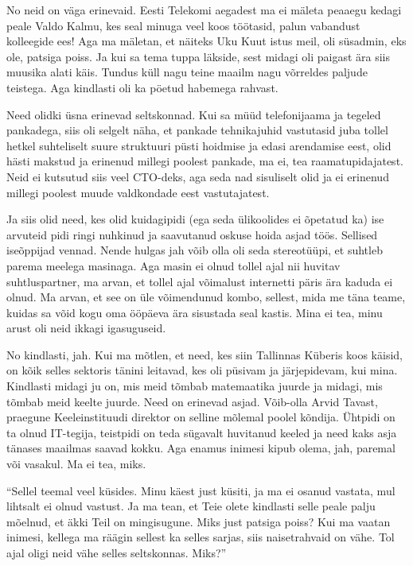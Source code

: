No neid on väga erinevaid. Eesti Telekomi aegadest ma ei mäleta peaaegu kedagi 
peale Valdo Kalmu, kes seal minuga veel koos töötasid, 
palun vabandust kolleegide ees! Aga ma mäletan, et näiteks Uku 
Kuut istus meil, oli süsadmin, eks ole, patsiga poiss. Ja 
kui sa tema tuppa läkside, sest midagi oli paigast ära siis muusika alati käis. 
Tundus küll nagu teine maailm nagu võrreldes paljude teistega. Aga kindlasti 
oli ka pöetud habemega rahvast.  

Need olidki üsna erinevad seltskonnad. Kui sa müüd telefonijaama ja  tegeled 
pankadega, siis oli selgelt näha, et pankade tehnikajuhid vastutasid juba 
tollel hetkel suhteliselt suure struktuuri püsti hoidmise ja edasi arendamise 
eest, olid hästi makstud ja erinenud millegi poolest pankade, ma ei, tea 
raamatupidajatest. Neid ei kutsutud siis veel CTO-deks, aga seda nad sisuliselt 
olid ja ei erinenud millegi poolest muude valdkondade eest vastutajatest. 

Ja siis olid need, kes olid kuidagipidi (ega seda ülikoolides ei õpetatud ka) 
ise arvuteid pidi ringi nuhkinud ja saavutanud oskuse hoida asjad töös. 
Sellised iseõppijad vennad. Nende hulgas jah võib olla oli seda stereotüüpi, et 
suhtleb parema meelega masinaga. Aga masin ei olnud tollel ajal nii huvitav 
suhtluspartner, ma arvan, et tollel ajal võimalust internetti päris ära kaduda 
ei olnud. Ma arvan, et see on üle võimendunud kombo, sellest, mida me täna 
teame, kuidas sa võid kogu oma ööpäeva ära sisustada seal kastis. Mina ei tea, 
minu arust oli neid ikkagi igasuguseid.


No kindlasti, jah. Kui ma mõtlen, et need, kes siin Tallinnas 
Küberis koos käisid, on kõik selles sektoris tänini  leitavad, kes 
oli püsivam ja järjepidevam, kui mina. Kindlasti midagi ju on, mis meid tõmbab 
matemaatika juurde ja midagi, mis tõmbab meid keelte juurde. Need on erinevad 
asjad. Võib-olla Arvid Tavast, praegune 
Keeleinstituudi direktor on selline mõlemal poolel 
kõndija. Ühtpidi on ta olnud IT-tegija, teistpidi on teda sügavalt huvitanud 
keeled ja need kaks asja tänases maailmas saavad  kokku. Aga enamus inimesi 
kipub olema, jah, paremal või vasakul. Ma ei tea, miks.

\enquote{Sellel teemal veel küsides. Minu käest just küsiti, ja ma ei osanud 
vastata, mul lihtsalt ei olnud vastust. Ja ma tean, et Teie olete kindlasti 
selle peale palju mõelnud, et äkki Teil on mingisugune. Miks just patsiga 
poiss? Kui ma vaatan  inimesi, kellega ma räägin sellest ka selles sarjas, siis 
naisetrahvaid on vähe. Tol ajal oligi neid vähe selles seltskonnas. Miks?}

